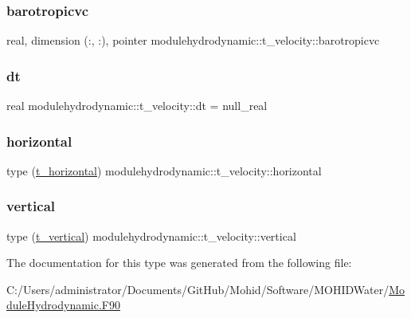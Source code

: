 \subsubsection{\texorpdfstring{barotropicvc}{barotropicvc}}
{\footnotesize\ttfamily real, dimension (\+:, \+:), pointer modulehydrodynamic\+::t\+\_\+velocity\+::barotropicvc\hspace{0.3cm}{\ttfamily [private]}}

\mbox{\label{structmodulehydrodynamic_1_1t__velocity_ac9d324c70103f53f724cfd2464faae14}} 
\subsubsection{\texorpdfstring{dt}{dt}}
{\footnotesize\ttfamily real modulehydrodynamic\+::t\+\_\+velocity\+::dt = null\+\_\+real\hspace{0.3cm}{\ttfamily [private]}}

\mbox{\label{structmodulehydrodynamic_1_1t__velocity_a2b4263bf8416a6bc1695d7b48aaeb583}} 
\subsubsection{\texorpdfstring{horizontal}{horizontal}}
{\footnotesize\ttfamily type (\mbox{\hyperlink{structmodulehydrodynamic_1_1t__horizontal}{t\+\_\+horizontal}}) modulehydrodynamic\+::t\+\_\+velocity\+::horizontal\hspace{0.3cm}{\ttfamily [private]}}

\mbox{\label{structmodulehydrodynamic_1_1t__velocity_a019b9d29b55014ecb90cd3cc31b4a186}} 
\subsubsection{\texorpdfstring{vertical}{vertical}}
{\footnotesize\ttfamily type (\mbox{\hyperlink{structmodulehydrodynamic_1_1t__vertical}{t\+\_\+vertical}}) modulehydrodynamic\+::t\+\_\+velocity\+::vertical\hspace{0.3cm}{\ttfamily [private]}}



The documentation for this type was generated from the following file\+:\begin{DoxyCompactItemize}
\item 
C\+:/\+Users/administrator/\+Documents/\+Git\+Hub/\+Mohid/\+Software/\+M\+O\+H\+I\+D\+Water/\mbox{\hyperlink{_module_hydrodynamic_8_f90}{Module\+Hydrodynamic.\+F90}}\end{DoxyCompactItemize}
